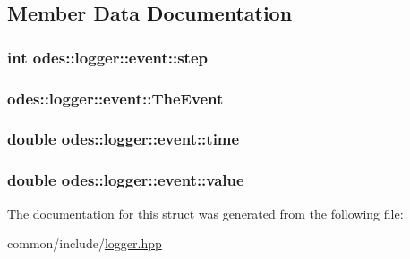 \subsection{Member Data Documentation}
\hypertarget{structodes_1_1logger_1_1event_ac8ce173f875f3c79148b56f659310a19}{
\subsubsection[{step}]{\setlength{\rightskip}{0pt plus 5cm}int odes\-::logger\-::event\-::step}}\label{structodes_1_1logger_1_1event_ac8ce173f875f3c79148b56f659310a19}
\hypertarget{structodes_1_1logger_1_1event_a788c846b1f2e2cb2fa04bd09cd1a5dcf}{
\subsubsection[{The\-Event}]{ odes\-::logger\-::event\-::\-The\-Event}}\label{structodes_1_1logger_1_1event_a788c846b1f2e2cb2fa04bd09cd1a5dcf}
\hypertarget{structodes_1_1logger_1_1event_acf7ad37303c62a3d0a8b861dfa22ef20}{
\subsubsection[{time}]{\setlength{\rightskip}{0pt plus 5cm}double odes\-::logger\-::event\-::time}}\label{structodes_1_1logger_1_1event_acf7ad37303c62a3d0a8b861dfa22ef20}
\hypertarget{structodes_1_1logger_1_1event_a28617fe70b6c59730b009f19ffbf2f7a}{
\subsubsection[{value}]{\setlength{\rightskip}{0pt plus 5cm}double odes\-::logger\-::event\-::value}}\label{structodes_1_1logger_1_1event_a28617fe70b6c59730b009f19ffbf2f7a}


The documentation for this struct was generated from the following file\-:\begin{DoxyCompactItemize}
\item 
common/include/\hyperlink{logger_8hpp}{logger.\-hpp}\end{DoxyCompactItemize}
